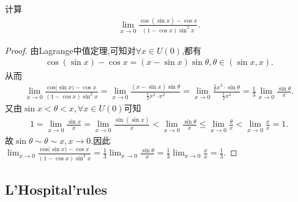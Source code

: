 \documentclass[../../main.tex]{subfiles}%
\begin{document}
\begin{example}
计算
\begin{align*}
\lim_{x \to 0} \frac{\cos(\sin x) - \cos x}{(1 - \cos x)\sin^{2}x}.
\end{align*}
\end{example}
\begin{proof}

由Lagrange中值定理,可知对$\forall x\in U\left( 0 \right)$,都有
\begin{align*}
\cos \left( \sin x \right) -\cos x=\left( x-\sin x \right) \sin \theta ,\theta \in \left( \sin x,x \right) .
\end{align*}
从而
\begin{align*}
\lim_{x\rightarrow 0} \frac{\mathrm{cos(}\sin x)-\cos x}{(1-\cos x)\sin ^2x}=\lim_{x\rightarrow 0} \frac{\left( x-\sin x \right) \sin \theta}{\frac{1}{2}x^2\cdot x^2}=\lim_{x\rightarrow 0} \frac{\frac{1}{6}x^3\cdot \sin \theta}{\frac{1}{2}x^4}=\frac{1}{3}\lim_{x\rightarrow 0} \frac{\sin \theta}{x}.
\end{align*}
又由$\sin x<\theta <x,\forall x\in U\left( 0 \right)$可知
\begin{align*}
1=\lim_{x\rightarrow 0} \frac{\sin x}{x}=\lim_{x\rightarrow 0} \frac{\sin \left( \sin x \right)}{x}<\lim_{x\rightarrow 0} \frac{\sin \theta}{x}\leqslant \lim_{x\rightarrow 0} \frac{\theta}{x}<\lim_{x\rightarrow 0} \frac{x}{x}=1.
\end{align*}
故$\sin \theta \sim \theta \sim x,x\rightarrow 0$.因此$\lim_{x\rightarrow 0} \frac{\mathrm{cos(}\sin x)-\cos x}{(1-\cos x)\sin ^2x}=\frac{1}{3}\lim_{x\rightarrow 0} \frac{\sin \theta}{x}=\frac{1}{3}\lim_{x\rightarrow 0} \frac{x}{x}=\frac{1}{3}$.

\end{proof}



\subsection{L'Hospital'rules}
\end{document}
